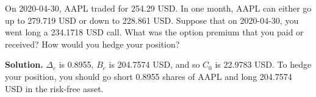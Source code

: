 \noindent On 2020-04-30, AAPL traded for 254.29 USD. In one month, AAPL can either go up to 279.719 USD or down to 228.861 USD. Suppose that on 2020-04-30, you went long a 234.1718 USD call. What was the option premium that you paid or received? How would you hedge your position?

\vspace{9pt}

\noindent\textbf{Solution.} $\Delta_{c}$ is 0.8955, $B_{c}$ is 204.7574 USD, and so $C_{0}$ is 22.9783 USD. To hedge your position, you should go short 0.8955 shares of AAPL and long 204.7574 USD in the risk-free asset.
